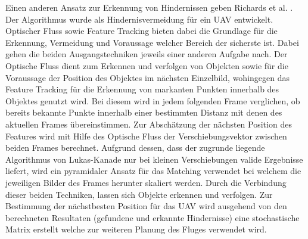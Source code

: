 \noindent
Einen anderen Ansatz zur Erkennung von Hindernissen geben Richards et al. \cite{richards2014obstacle} . Der Algorithmus wurde als Hindernisvermeidung für ein UAV entwickelt. Optischer Fluss sowie Feature Tracking bieten dabei die Grundlage für die Erkennung, Vermeidung und Voraussage welcher Bereich der sicherste ist. Dabei gehen die beiden Ausgangstechniken jeweils einer anderen Aufgabe nach. Der Optische Fluss dient zum Erkennen und verfolgen von Objekten sowie für die Voraussage der Position des Objektes im nächsten Einzelbild, wohingegen das Feature Tracking \cite{shi1994good} für die Erkennung von markanten Punkten innerhalb des Objektes genutzt wird. Bei diesem wird in jedem folgenden Frame verglichen, ob bereits bekannte Punkte innerhalb einer bestimmten Distanz mit denen des aktuellen Frames übereinstimmen. Zur Abschätzung der nächsten Position des Features wird mit Hilfe des Optische Fluss der  Verschiebungsvektor zwischen beiden Frames berechnet. Aufgrund dessen, dass der zugrunde liegende Algorithmus von Lukas-Kanade \cite{lucas1981iterative} nur bei kleinen Verschiebungen valide Ergebnisse liefert, wird ein pyramidaler Ansatz \cite{bouguet2001pyramidal} für das Matching verwendet bei welchem die jeweiligen Bilder des Frames herunter skaliert werden. Durch die Verbindung dieser beiden Techniken, lassen sich Objekte erkennen und verfolgen. Zur Bestimmung der nächstbesten Position für das UAV wird ausgehend von den berechneten Resultaten (gefundene und erkannte Hindernisse) eine stochastische Matrix erstellt welche zur weiteren Planung des Fluges verwendet wird.\\

